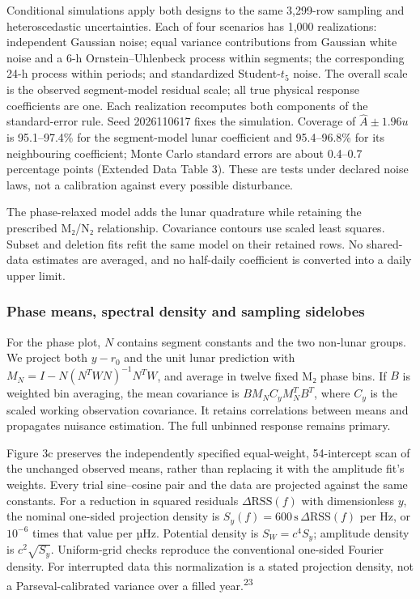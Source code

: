 \documentclass[
  10pt,
  a4paper,
]{article}
\begin{document}
Conditional simulations apply both designs to the same 3,299-row
sampling and heteroscedastic uncertainties. Each of four scenarios has
1,000 realizations: independent Gaussian noise; equal variance
contributions from Gaussian white noise and a 6-h Ornstein--Uhlenbeck
process within segments; the corresponding 24-h process within periods;
and standardized Student-\(t_5\) noise. The overall scale is the
observed segment-model residual scale; all true physical response
coefficients are one. Each realization recomputes both components of the
standard-error rule. Seed 2026110617 fixes the simulation. Coverage of
\(\hat A\pm1.96u\) is 95.1--97.4\% for the segment-model lunar
coefficient and 95.4--96.8\% for its neighbouring coefficient; Monte
Carlo standard errors are about 0.4--0.7 percentage points (Extended
Data Table 3). These are tests under declared noise laws, not a
calibration against every possible disturbance.

The phase-relaxed model adds the lunar quadrature while retaining the
prescribed M₂/N₂ relationship. Covariance contours use scaled least
squares. Subset and deletion fits refit the same model on their retained
rows. No shared-data estimates are averaged, and no half-daily
coefficient is converted into a daily upper limit.

\hypertarget{phase-means-spectral-density-and-sampling-sidelobes}{%
\subsubsection{Phase means, spectral density and sampling
sidelobes}\label{phase-means-spectral-density-and-sampling-sidelobes}}

For the phase plot, \(N\) contains segment constants and the two
non-lunar groups. We project both \(y-r_0\) and the unit lunar
prediction with \(M_N=I-N(N^TWN)^{-1}N^TW\), and average in twelve fixed
M₂ phase bins. If \(B\) is weighted bin averaging, the mean covariance
is \(BM_NC_yM_N^TB^T\), where \(C_y\) is the scaled working observation
covariance. It retains correlations between means and propagates
nuisance estimation. The full unbinned response remains primary.

Figure 3c preserves the independently specified equal-weight,
54-intercept scan of the unchanged observed means, rather than replacing
it with the amplitude fit's weights. Every trial sine--cosine pair and
the data are projected against the same constants. For a reduction in
squared residuals \(\Delta\mathrm{RSS}(f)\) with dimensionless \(y\),
the nominal one-sided projection density is
\(S_y(f)=600\,\mathrm{s}\,\Delta\mathrm{RSS}(f)\) per Hz, or \(10^{-6}\)
times that value per µHz. Potential density is \(S_W=c^4S_y\); amplitude
density is \(c^2\sqrt{S_y}\). Uniform-grid checks reproduce the
conventional one-sided Fourier density. For interrupted data this
normalization is a stated projection density, not a Parseval-calibrated
variance over a filled year.\textsuperscript{23}
\end{document}
